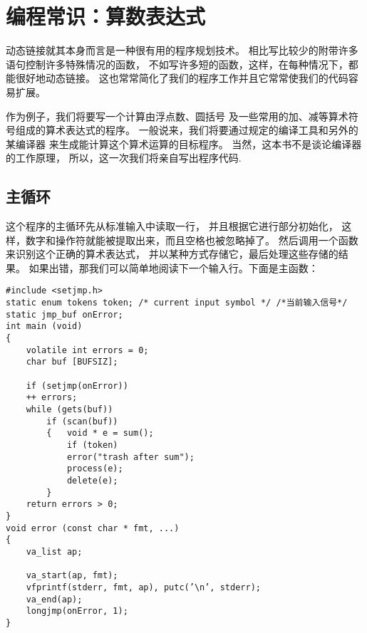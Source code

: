 

\chapter{编程常识：算数表达式}
\label{ch:psArithmeticExpressions}

动态链接就其本身而言是一种很有用的程序规划技术。
相比写比较少的附带许多  语句控制许多特殊情况的函数，
不如写许多短的函数，这样，在每种情况下，都能很好地动态链接。
这也常常简化了我们的程序工作并且它常常使我们的代码容易扩展。


作为例子，我们将要写一个计算由浮点数、圆括号
及一些常用的加、减等算术符号组成的算术表达式的程序。
一般说来，我们将要通过规定的编译工具和另外的某编译器
来生成能计算这个算术运算的目标程序。
当然，这本书不是谈论编译器的工作原理，
所以，这一次我们将亲自写出程序代码.

\section{主循环}
\label{sec:mainloop}

这个程序的主循环先从标准输入中读取一行，
并且根据它进行部分初始化，
这样，数字和操作符就能被提取出来，而且空格也被忽略掉了。
然后调用一个函数来识别这个正确的算术表达式，
并以某种方式存储它，最后处理这些存储的结果。
如果出错，那我们可以简单地阅读下一个输入行。下面是主函数：
\begin{lstlisting}
#include <setjmp.h>
static enum tokens token; /* current input symbol */ /*当前输入信号*/
static jmp_buf onError;
int main (void)
{   
    volatile int errors = 0;
    char buf [BUFSIZ];

    if (setjmp(onError))
    ++ errors;
    while (gets(buf))
        if (scan(buf))
        {   void * e = sum();
            if (token)
            error("trash after sum");
            process(e);
            delete(e);
        }
    return errors > 0;
}
void error (const char * fmt, ...)
{   
    va_list ap;

    va_start(ap, fmt);
    vfprintf(stderr, fmt, ap), putc(’\n’, stderr);
    va_end(ap);
    longjmp(onError, 1);
}
\end{lstlisting}

